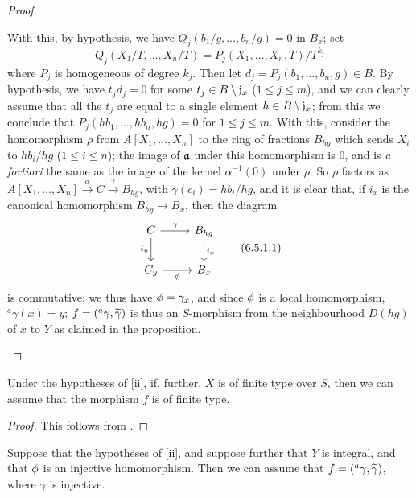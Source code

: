 \begin{proof}
\begin{enumerate}[label=(\roman*)]
        With this, by hypothesis, we have $Q_j(b_1/g,\ldots,b_n/g)=0$ in $B_x$;
        set
        \[
            Q_j(X_1/T,\ldots,X_n/T)=P_j(X_1,\ldots,X_n,T)/T^{k_j}
        \]
        where $P_j$ is homogeneous of degree $k_j$.
        Then let $d_j=P_j(b_1,\ldots,b_n,g)\in B$.
        By hypothesis, we have $t_jd_j=0$ for some $t_j\in B\setminus\mathfrak{j}_x$ ($1\leqslant j\leqslant m$), and we can clearly assume that all the $t_j$ are equal to a single element $h\in B\setminus\mathfrak{j}_x$;
        from this we conclude that $P_j(hb_1,\ldots,hb_n,hg)=0$ for $1\leqslant j\leqslant m$.
        With this, consider the homomorphism $\rho$ from $A[X_1,\ldots,X_n]$ to the ring of fractions $B_{hg}$ which sends $X_i$ to $hb_i/hg$ ($1\leqslant i\leqslant n$);
        the image of $\mathfrak{a}$ under this homomorphism is $0$, and is \emph{a fortiori} the same as the image of the kernel $\alpha^{-1}(0)$ under $\rho$.
        So $\rho$ factors as $A[X_1,\ldots,X_n]\xrightarrow{\alpha}C\xrightarrow{\gamma}B_{hg}$, with $\gamma(c_i)=hb_i/hg$, and it is clear that, if $i_x$ is the canonical homomorphism $B_{hg}\to B_x$, then the diagram
        \[
            \begin{tikzcd}
                C\ar[r,"\gamma"]\ar[d,swap,"i_y"] &
                B_{hg}\ar[d,"i_x"]\\
                C_y\ar[r,swap,"\vphi"] &
                B_x
            \end{tikzcd}
            \tag{6.5.1.1}
        \]
        is commutative;
        we thus have $\phi=\gamma_x$, and since $\phi$ is a local homomorphism, $^a\gamma(x)=y$;
        $f=({}^a\gamma,\widetilde{\gamma})$ is thus an $S$-morphism from the neighbourhood $D(hg)$ of $x$ to $Y$ as claimed in the proposition.
\end{enumerate}
\end{proof}

\begin{cor}[6.5.2]
\label{1.6.5.2}
Under the hypotheses of [ii], if, further, $X$ is of finite type over $S$, then we can assume that the morphism $f$ is of finite type.
\end{cor}

\begin{proof}
\label{proof-1.6.5.2}
This follows from .
\end{proof}

\begin{cor}[6.5.3]
\label{1.6.5.3}
Suppose that the hypotheses of [ii], and suppose further that $Y$ is integral, and that $\phi$ is an injective homomorphism.
Then we can assume that $f=({}^a\gamma,\widetilde{\gamma})$, where $\gamma$ is injective.
\end{cor}

